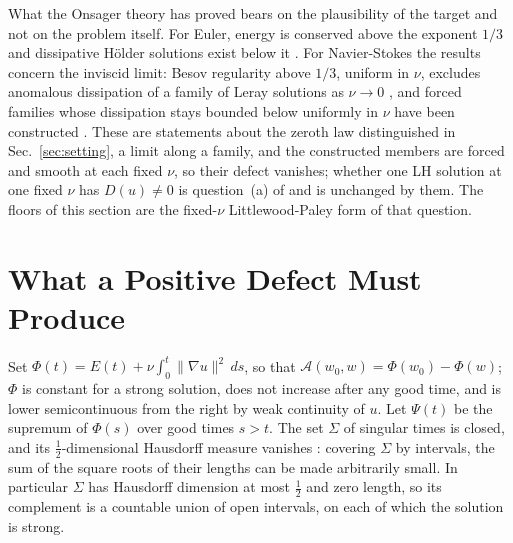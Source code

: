 \documentclass[letterpaper,twocolumn]{article}
\newcommand{\A}{\mathcal{A}}
\begin{document}
What the Onsager theory has proved bears on the plausibility of the
target and not on the problem itself. For Euler, energy is conserved
above the exponent $1/3$ \cite{ConETit94,CheConFriShv08} and
dissipative H\"older solutions exist below it \cite{Ise18,BucDeLSzeVic19}.
For Navier-Stokes the results concern the inviscid limit: Besov
regularity above $1/3$, uniform in $\nu$, excludes anomalous dissipation
of a family of Leray solutions as $\nu \to 0$ \cite{DriEyi19}, and forced
families whose dissipation stays bounded below uniformly in $\nu$ have
been constructed \cite{BruDeL23,BruColCriDeLSor24}. These are statements
about the zeroth law distinguished in Sec.~\ref{sec:setting}, a limit
along a family, and the constructed members are forced and smooth at
each fixed $\nu$, so their defect vanishes; whether one LH solution at
one fixed $\nu$ has $D(u) \neq 0$ is question~(a) of \cite{DucRob00} and
is unchanged by them. The floors of this section are the fixed-$\nu$
Littlewood-Paley form of that question.

\section{What a Positive Defect Must Produce}
\label{sec:produce}

Set $\Phi(t) = E(t) + \nu\int_0^t\|\nabla u\|^2\,ds$, so that $\A(w_0,w)
= \Phi(w_0) - \Phi(w)$; $\Phi$ is constant for a strong solution, does
not increase after any good time, and is lower semicontinuous from the
right by weak continuity of $u$. Let $\Psi(t)$ be the supremum of
$\Phi(s)$ over good times $s > t$. The set $\Sigma$ of singular times is
closed, and its $\frac12$-dimensional Hausdorff measure vanishes
\cite{RobRodSad16}: covering $\Sigma$ by intervals, the sum of the square
roots of their lengths can be made arbitrarily small. In particular
$\Sigma$ has Hausdorff dimension at most $\frac12$ and zero length, so
its complement is a countable union of open intervals, on each of which
the solution is strong.
\end{document}
